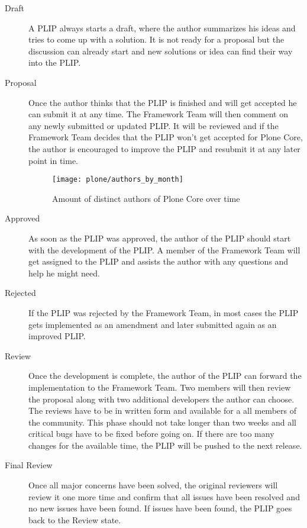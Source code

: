 \begin{description}

  \item[Draft] A \ac{PLIP} always starts a draft, where the author summarizes
    his ideas and tries to come up with a solution. It is not ready for a
    proposal but the discussion can already start and new solutions or idea can
    find their way into the \ac{PLIP}.

  \item[Proposal] Once the author thinks that the \ac{PLIP} is finished and
    will get accepted he can submit it at any time. The Framework Team will
    then comment on any newly submitted or updated \ac{PLIP}. It will be
    reviewed and if the Framework Team decides that the \ac{PLIP} won't get
    accepted for Plone Core, the author is encouraged to improve the \ac{PLIP}
    and resubmit it at any later point in time.

\begin{figure}[hbtp]
  \centering
  \texttt{[image: plone/authors\_by\_month]}
  \caption{Amount of distinct authors of Plone Core over time}
\end{figure}

  \item[Approved] As soon as the \ac{PLIP} was approved, the author of the
    \ac{PLIP} should start with the development of the \ac{PLIP}. A member of
    the Framework Team will get assigned to the \ac{PLIP} and assists the
    author with any questions and help he might need.

  \item[Rejected] If the \ac{PLIP} was rejected by the Framework Team, in most
    cases the \ac{PLIP} gets implemented as an amendment and later submitted
    again as an improved \ac{PLIP}.

  \item[Review] Once the development is complete, the author of the \ac{PLIP}
    can forward the implementation to the Framework Team. Two members will then
    review the proposal along with two additional developers the author can
    choose. The reviews have to be in written form and available for a all
    members of the community. This phase should not take longer than two weeks
    and all critical bugs have to be fixed before going on. If there are too
    many changes for the available time, the \ac{PLIP} will be pushed to the
    next release.

  \item[Final Review] Once all major concerns have been solved, the original
    reviewers will review it one more time and confirm that all issues have
    been resolved and no new issues have been found. If issues have been found,
    the \ac{PLIP} goes back to the Review state.


\end{description}
